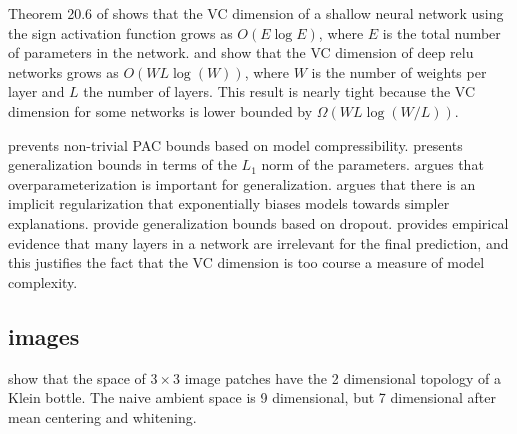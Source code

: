 \documentclass{article}
\begin{document}
Theorem 20.6 of \citet{shalev2014understanding} shows that the VC dimension of a shallow neural network using the sign activation function grows as $O(E\log E)$, 
where $E$ is the total number of parameters in the network.
\citet{bartlett2017nearly} and \citet{harvey2017nearly} show that the VC dimension of deep relu networks grows as $O(WL\log(W))$,
where $W$ is the number of weights per layer and $L$ the number of layers.
This result is nearly tight because the VC dimension for some networks is lower bounded by $\Omega(WL\log(W/L))$.

\citet{zhou2018compressibility} prevents non-trivial PAC bounds based on model compressibility.
\citet{barron2018approximation} presents generalization bounds in terms of the $L_1$ norm of the parameters.
\citet{neyshabur2018role} argues that overparameterization is important for generalization.
\citet{perez2018deep} argues that there is an implicit regularization that exponentially biases models towards simpler explanations.
\citet{mou2018dropout} provide generalization bounds based on dropout.
\citet{zhang2019all} provides empirical evidence that many layers in a network are irrelevant for the final prediction,
and this justifies the fact that the VC dimension is too course a measure of model complexity.

\subsection{images}

\citet{carlsson2008local} show that the space of $3\times3$ image patches have the 2 dimensional topology of a Klein bottle.
The naive ambient space is 9 dimensional,
but 7 dimensional after mean centering and whitening.


\end{document}
